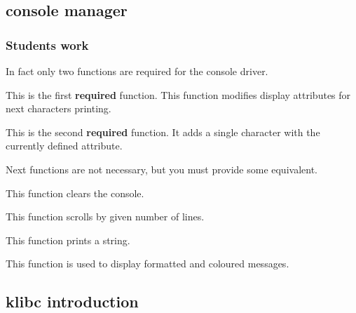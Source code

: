 %
%

\subsection{console manager}

\subsubsection{Students work}

In fact only two functions are required for the console driver.


This is  the first \textbf{required} function.  This function modifies
display attributes for next characters printing.


This  is  the second  \textbf{required}  function.  It  adds a  single
character with the currently defined attribute.

Next  functions   are  not  necessary,  but  you   must  provide  some
equivalent.


This function clears the console.


This function scrolls by given number of lines.


This function prints a string.


This function is used to display formatted and coloured messages.



%
%

\subsection{klibc introduction}


